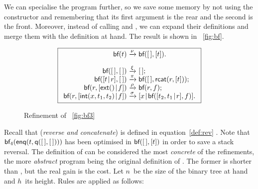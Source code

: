 We can specialise the program further, so we save some memory by not
using the constructor  and remembering
that its first argument is the rear and the second is the
front. Moreover, instead of calling 
and , we can expand their
definitions and merge them with the definition at hand. The result is
shown in \fig~\vref{fig:bf}.
\begin{figure}
\begin{equation*}
\boxed{
\begin{array}{r@{\;}c@{\;}l}
\fun{bf}(t) & \xrightarrow{\smash{\nu}} & \fun{bf}(\el,[t]).\\
\\
\fun{bf}(\el,\el) & \xrightarrow{\smash{\xi}} & \el;\\
\fun{bf}(\cons{t}{r},\el) & \xrightarrow{\smash{\pi}} &
  \fun{bf}(\el,\fun{rcat}(r,[t]));\\
\fun{bf}(r,\cons{\fun{ext}()}{f})
  & \xrightarrow{\smash{\rho}} & \fun{bf}(r,f);\\
\fun{bf}(r,\cons{\fun{int}(x,t_1,t_2)}{f})
  & \xrightarrow{\smash{\sigma}}
  & \cons{x}{\fun{bf}(\cons{t_2,t_1}{r},f)}.
\end{array}}
\end{equation*}
\caption{Refinement of \fig~\vref{fig:bf3}}
\label{fig:bf}
\end{figure}
Recall that  (\emph{reverse and
  concatenate}) is defined in equation~\eqref{def:rev}
. Note that
\(\textsf{bf}_4(\textsf{enq}(t,\textsf{q}([\,],[\,])))\)
has been optimised in \(\textsf{bf}([\,],[t])\) in
order to save a stack reversal. The definition of
 can be considered the most
\emph{concrete} of the refinements, the more \emph{abstract} program
being the original definition of
. The former is shorter
than , but the real gain
is the cost. Let \(n\)~be the size of the binary tree at hand and
\(h\)~its height. Rules are applied as
follows:
